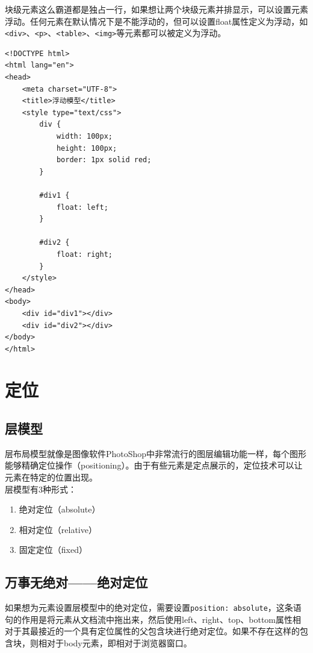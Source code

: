 块级元素这么霸道都是独占一行，如果想让两个块级元素并排显示，可以设置元素浮动。任何元素在默认情况下是不能浮动的，但可以设置float属性定义为浮动，如\lstinline|<div>|、\lstinline|<p>|、\lstinline|<table>|、\lstinline|<img>|等元素都可以被定义为浮动。

\begin{lstlisting}[style=htmlcssjs, title=浮动模型]
<!DOCTYPE html>
<html lang="en">
<head>
    <meta charset="UTF-8">
    <title>浮动模型</title>
    <style type="text/css">
        div {
            width: 100px;
            height: 100px;
            border: 1px solid red;
        }

        #div1 {
            float: left;
        }

        #div2 {
            float: right;
        }
    </style>
</head>
<body>
    <div id="div1"></div>
    <div id="div2"></div>
</body>
</html>
\end{lstlisting}

\newpage

\section{定位}

\subsection{层模型}

层布局模型就像是图像软件PhotoShop中非常流行的图层编辑功能一样，每个图形能够精确定位操作（positioning）。由于有些元素是定点展示的，定位技术可以让元素在特定的位置出现。 \\

层模型有3种形式：

\begin{enumerate}
    \item 绝对定位（absolute）
    \item 相对定位（relative）
    \item 固定定位（fixed）
\end{enumerate}

\subsection{万事无绝对——绝对定位}

如果想为元素设置层模型中的绝对定位，需要设置\lstinline|position: absolute|，这条语句的作用是将元素从文档流中拖出来，然后使用left、right、top、bottom属性相对于其最接近的一个具有定位属性的父包含块进行绝对定位。如果不存在这样的包含块，则相对于body元素，即相对于浏览器窗口。 \\

